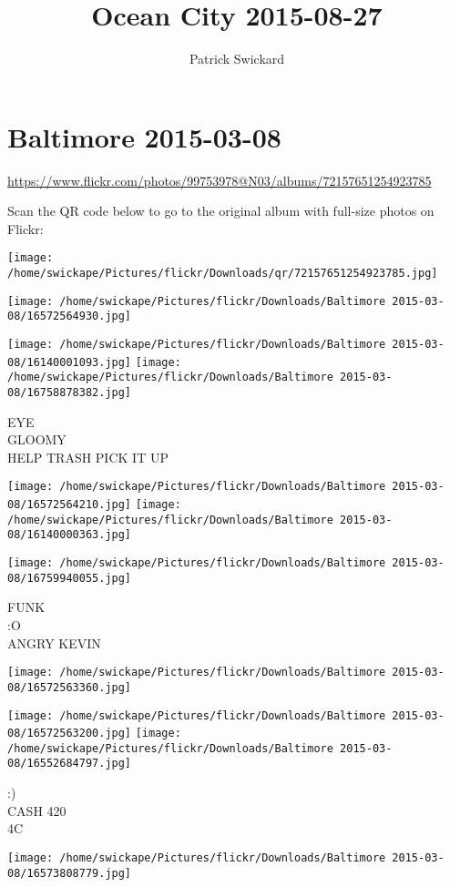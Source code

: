 \documentclass[10pt,letterpaper]{article}
\title{Ocean City 2015-08-27}
\author{Patrick Swickard}
\date{}
\begin{document}
\section*{Baltimore 2015-03-08}

\url{https://www.flickr.com/photos/99753978@N03/albums/72157651254923785}

Scan the QR code below to go to the original album with full-size photos on Flickr:

\texttt{[image: /home/swickape/Pictures/flickr/Downloads/qr/72157651254923785.jpg]}
\pagebreak

\texttt{[image: /home/swickape/Pictures/flickr/Downloads/Baltimore 2015-03-08/16572564930.jpg]}

\vspace{0.25in}
\texttt{[image: /home/swickape/Pictures/flickr/Downloads/Baltimore 2015-03-08/16140001093.jpg]}
\texttt{[image: /home/swickape/Pictures/flickr/Downloads/Baltimore 2015-03-08/16758878382.jpg]}

EYE\\
GLOOMY\\
HELP TRASH PICK IT UP
\pagebreak

\texttt{[image: /home/swickape/Pictures/flickr/Downloads/Baltimore 2015-03-08/16572564210.jpg]}
\texttt{[image: /home/swickape/Pictures/flickr/Downloads/Baltimore 2015-03-08/16140000363.jpg]}

\texttt{[image: /home/swickape/Pictures/flickr/Downloads/Baltimore 2015-03-08/16759940055.jpg]}

FUNK\\
:O\\
ANGRY KEVIN
\pagebreak

\texttt{[image: /home/swickape/Pictures/flickr/Downloads/Baltimore 2015-03-08/16572563360.jpg]}

\vspace{0.25in}
\texttt{[image: /home/swickape/Pictures/flickr/Downloads/Baltimore 2015-03-08/16572563200.jpg]}
\texttt{[image: /home/swickape/Pictures/flickr/Downloads/Baltimore 2015-03-08/16552684797.jpg]}

:)\\
CASH 420\\
4C
\pagebreak

\texttt{[image: /home/swickape/Pictures/flickr/Downloads/Baltimore 2015-03-08/16573808779.jpg]}
\end{document}
